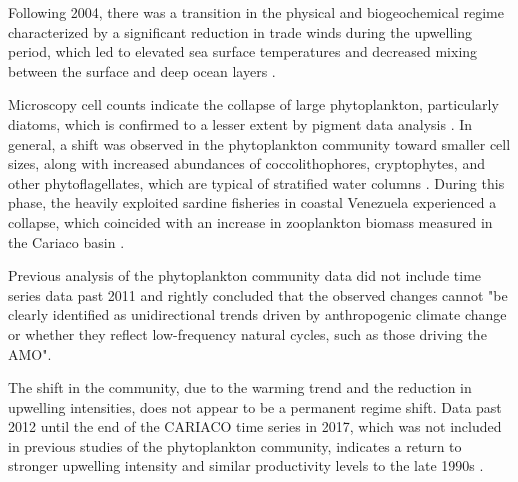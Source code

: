 \documentclass[draft]{agujournal2019}
\begin{document}
    Following 2004, there was a transition in the physical and biogeochemical regime characterized by a significant reduction in trade winds during the upwelling period, which led to elevated sea surface temperatures and decreased mixing between the surface and deep ocean layers \cite{taylor_ecosystem_2012}.

    Microscopy cell counts indicate the collapse of large phytoplankton, particularly diatoms, which is confirmed to a lesser extent by pigment data analysis \cite{pinckney_phytoplankton_2015}. In general, a shift was observed in the phytoplankton community toward smaller cell sizes, along with increased abundances of coccolithophores, cryptophytes, and other phytoflagellates, which are typical of stratified water columns \cite{pinckney_phytoplankton_2015}. During this phase, the heavily exploited sardine fisheries in coastal Venezuela experienced a collapse, which coincided with an increase in zooplankton biomass measured in the Cariaco basin \cite{taylor_ecosystem_2012}.

    Previous analysis of the phytoplankton community data did not include time series data past 2011 and  rightly concluded that the observed changes cannot "be clearly identified as unidirectional trends driven by anthropogenic climate change or whether they reflect low-frequency natural cycles, such as those driving the AMO".  
    
    
    The shift in the community, due to the warming trend and the reduction in upwelling intensities, does not appear to be a permanent regime shift. Data past 2012 until the end of the CARIACO time series in 2017, which was not included in previous studies of the phytoplankton community, indicates a return to stronger upwelling intensity and similar productivity levels to the late 1990s \cite{muller-karger_scientific_2019}.

\end{document}
